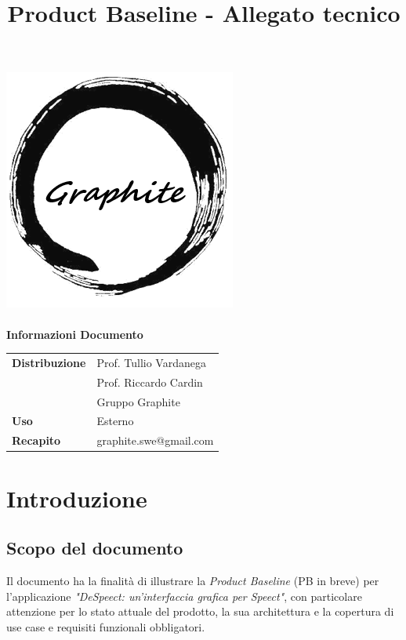\documentclass[openany,12pt,a4paper]{report}
\title{Product Baseline - Allegato tecnico}
\author{}
\begin{document}
	\makeatletter
	\begin{titlepage}
		\setlength{\headsep}{0pt}  
		\begin{center}
			\includegraphics[width=0.5\linewidth]{img/Logo.png}\\[1em]
			{\huge \bfseries  \@title }\\[10ex]
			\textbf{\Large Informazioni Documento} \\[2em]
			\bgroup
			\def\arraystretch{1.5}
			\begin{tabular}{l|l}
				\textbf{Distribuzione} & Prof. Tullio Vardanega \\
				& Prof. Riccardo Cardin \\
				& Gruppo Graphite \\
				\textbf{Uso} & Esterno \\
				\textbf{Recapito} & graphite.swe@gmail.com \\
			\end{tabular}
			\egroup
		\end{center}
	\end{titlepage}
	\makeatother
	
	\thispagestyle{empty}
	\newpage
	
	\tableofcontents
	
	\chapter{Introduzione}
	
	\section{Scopo del documento}
	
	Il documento ha la finalità di illustrare la \textit{Product Baseline} (PB in breve) per l’applicazione
	\textit{"DeSpeect: un'interfaccia grafica per Speect"}, con particolare attenzione per lo stato attuale del prodotto, la sua architettura e la copertura di use case e requisiti funzionali obbligatori.
	
\end{document}
